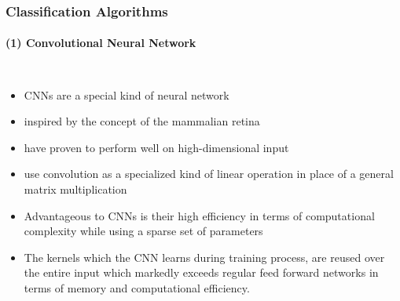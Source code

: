 \documentclass[10pt,usepdftitle=false,aspectratio=169]{beamer}
\begin{document}
\begin{frame}\frametitle{Classification Algorithms}
    \framesubtitle{(1) Convolutional Neural Network}

	\begin{columns}
	
		\vspace{2em}
		\begin{itemize}
			\item CNNs are a special kind of neural network
			\item inspired by the concept of the mammalian retina
			\item have proven to perform well on high-dimensional input 
			\item use convolution as a specialized kind of linear operation in place of a general matrix multiplication
			\item Advantageous to CNNs is their high efficiency in terms of  computational complexity while using a sparse set of parameters
			\item The kernels which the CNN learns during training process, are reused over the entire input which markedly exceeds regular feed forward networks in terms of memory and computational efficiency.


		\end{itemize}
		
		

		\end{columns}
	\end{frame}
\end{document}

